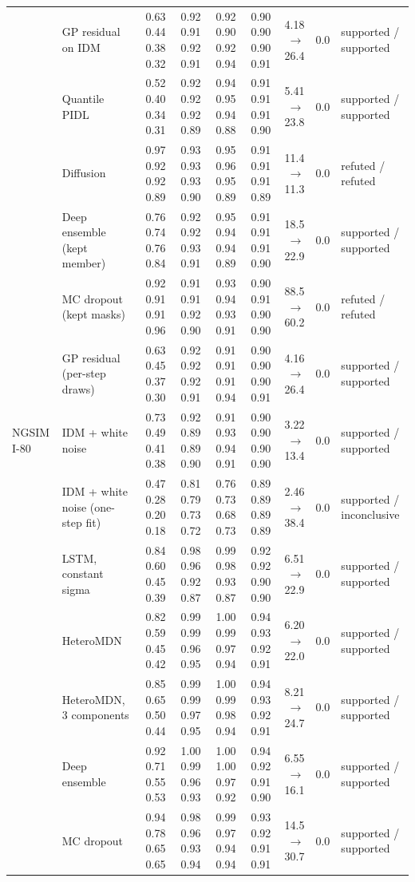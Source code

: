 \begin{table}[htbp]
\begin{tabular}{llrrrrrrl}
 & GP residual on IDM & 0.63 0.44 0.38 0.32 & 0.92 0.91 0.92 0.91 & 0.92 0.90 0.92 0.94 & 0.90 0.90 0.90 0.91 & 4.18 $\rightarrow$ 26.4 & 0.0 & supported / supported \\
 & Quantile PIDL & 0.52 0.40 0.34 0.31 & 0.92 0.92 0.92 0.89 & 0.94 0.95 0.94 0.88 & 0.91 0.91 0.91 0.90 & 5.41 $\rightarrow$ 23.8 & 0.0 & supported / supported \\
 & Diffusion & 0.97 0.92 0.92 0.89 & 0.93 0.93 0.93 0.90 & 0.95 0.96 0.95 0.89 & 0.91 0.91 0.91 0.89 & 11.4 $\rightarrow$ 11.3 & 0.0 & refuted / refuted \\
 & Deep ensemble (kept member) & 0.76 0.74 0.76 0.84 & 0.92 0.92 0.93 0.91 & 0.95 0.94 0.94 0.89 & 0.91 0.91 0.91 0.90 & 18.5 $\rightarrow$ 22.9 & 0.0 & supported / supported \\
 & MC dropout (kept masks) & 0.92 0.91 0.91 0.96 & 0.91 0.91 0.92 0.90 & 0.93 0.94 0.93 0.91 & 0.90 0.91 0.90 0.90 & 88.5 $\rightarrow$ 60.2 & 0.0 & refuted / refuted \\
 & GP residual (per-step draws) & 0.63 0.45 0.37 0.30 & 0.92 0.92 0.92 0.91 & 0.91 0.91 0.91 0.94 & 0.90 0.90 0.90 0.91 & 4.16 $\rightarrow$ 26.4 & 0.0 & supported / supported \\
\midrule
NGSIM I-80 & IDM + white noise & 0.73 0.49 0.41 0.38 & 0.92 0.89 0.89 0.90 & 0.91 0.93 0.94 0.91 & 0.90 0.90 0.90 0.90 & 3.22 $\rightarrow$ 13.4 & 0.0 & supported / supported \\
 & IDM + white noise (one-step fit) & 0.47 0.28 0.20 0.18 & 0.81 0.79 0.73 0.72 & 0.76 0.73 0.68 0.73 & 0.89 0.89 0.89 0.89 & 2.46 $\rightarrow$ 38.4 & 0.0 & supported / inconclusive \\
 & LSTM, constant sigma & 0.84 0.60 0.45 0.39 & 0.98 0.96 0.92 0.87 & 0.99 0.98 0.93 0.87 & 0.92 0.92 0.90 0.90 & 6.51 $\rightarrow$ 22.9 & 0.0 & supported / supported \\
 & HeteroMDN & 0.82 0.59 0.45 0.42 & 0.99 0.99 0.96 0.95 & 1.00 0.99 0.97 0.94 & 0.94 0.93 0.92 0.91 & 6.20 $\rightarrow$ 22.0 & 0.0 & supported / supported \\
 & HeteroMDN, 3 components & 0.85 0.65 0.50 0.44 & 0.99 0.99 0.97 0.95 & 1.00 0.99 0.98 0.94 & 0.94 0.93 0.92 0.91 & 8.21 $\rightarrow$ 24.7 & 0.0 & supported / supported \\
 & Deep ensemble & 0.92 0.71 0.55 0.53 & 1.00 0.99 0.96 0.93 & 1.00 1.00 0.97 0.92 & 0.94 0.92 0.91 0.90 & 6.55 $\rightarrow$ 16.1 & 0.0 & supported / supported \\
 & MC dropout & 0.94 0.78 0.65 0.65 & 0.98 0.96 0.93 0.94 & 0.99 0.97 0.94 0.94 & 0.93 0.92 0.91 0.91 & 14.5 $\rightarrow$ 30.7 & 0.0 & supported / supported \\

\end{tabular}
\end{table}
